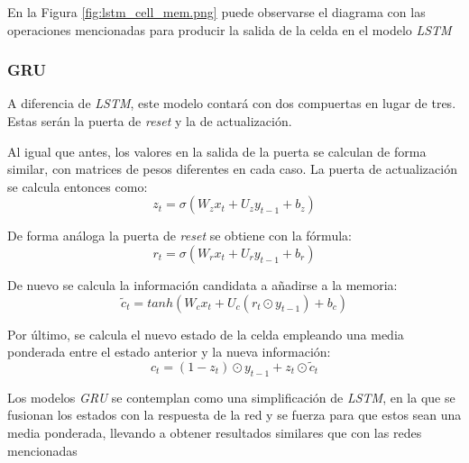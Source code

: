 En la Figura \ref{fig:lstm_cell_mem.png} puede observarse el diagrama con las operaciones mencionadas
para producir la salida de la celda en el modelo \textit{LSTM}

\subsubsection{GRU}
A diferencia de \textit{LSTM}, este modelo contará con dos compuertas en lugar 
de tres. Estas serán la puerta de \textit{reset} y la de actualización.

Al igual que antes, los valores en la salida de la puerta se calculan de forma similar,
con matrices de pesos diferentes en cada caso.
La puerta de actualización se calcula entonces como:
\begin{equation}
    z_t = \sigma(W_z x_t + U_z y_{t-1} + b_z)
\end{equation}

De forma análoga la puerta de \textit{reset} se obtiene con la fórmula:
\begin{equation}
    r_t = \sigma(W_r x_t + U_r y_{t-1} + b_r)
\end{equation}

De nuevo se calcula la información candidata a añadirse a la memoria:
\begin{equation}
    \widetilde{c}_t = tanh(W_c x_t + U_c (r_t \odot y_{t-1}) + b_c)
\end{equation}

Por último, se calcula el nuevo estado de la celda empleando una media ponderada
entre el estado anterior y la nueva información:
\begin{equation}
    c_t = (1 - z_t) \odot y_{t-1} + z_t \odot \widetilde{c}_t
\end{equation}

Los modelos \textit{GRU} se contemplan como una simplificación de \textit{LSTM},
en la que se fusionan los estados con la respuesta de la red y se fuerza para que estos
sean una media ponderada, llevando a obtener resultados similares que con las redes
mencionadas \cite{book:rue2019}

